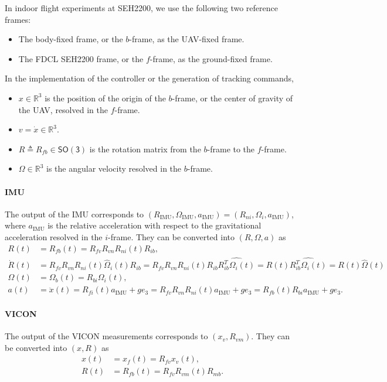 \documentclass[11pt]{article}
\newcommand{\SO}{\ensuremath{\mathsf{SO(3)}}}
\renewcommand{\Re}{\ensuremath{\mathbb{R}}}
\begin{document}
In indoor flight experiments at SEH2200, we use the following two reference frames:

\begin{itemize}
\item The body-fixed frame, or the $b$-frame, as the UAV-fixed frame.
\item The FDCL SEH2200 frame, or the $f$-frame, as the ground-fixed frame. 
\end{itemize}

\noindent In the implementation of the controller or the generation of tracking commands, 

\begin{itemize}
\item $x\in\Re^3$ is the position of the origin of the $b$-frame, or the center of gravity of the UAV, resolved in the $f$-frame. 
\item  $v=\dot x\in\Re^3$.
\item $R\triangleq R_{fb}\in\SO$ is the rotation matrix from the $b$-frame to the $f$-frame. 
\item $\Omega\in\Re^3$ is the angular velocity resolved in the $b$-frame. 
\end{itemize}

\newcommand{\IMU}{\mathrm{IMU}}
\paragraph{IMU} The output of the IMU corresponds to $(R_\IMU, \Omega_\IMU, a_\IMU)=(R_{ni},\Omega_{i},a_{\mathrm{IMU}})$, where $a_{\mathrm{IMU}}$ is the relative acceleration with respect to the gravitational acceleration resolved in the $i$-frame. They can be converted into $(R,\Omega,a)$ as
\begin{align}
R(t) & =R_{fb}(t) =  R_{fv} R_{vn} R_{ni}(t) R_{ib},\\
\dot R(t) & = R_{fv} R_{vn} R_{ni}(t)\hat\Omega_i(t) R_{ib}
=R_{fv} R_{vn} R_{ni}(t) R_{ib} \widehat{R_{ib}^T\Omega_i(t)}=R(t)\widehat{R_{ib}^T\Omega_i(t)}=R(t)\hat\Omega(t)
\\
\Omega(t) & = \Omega_b(t) =  R_{bi} \Omega_i(t),\\
a(t) & =\ddot x(t) = R_{fi}(t)a_{\mathrm{IMU}}+ge_3 = R_{fv}R_{vn} R_{ni}(t) a_{\mathrm{IMU}}+ge_3=R_{fb}(t) R_{bi} a_{\mathrm{IMU}} + ge_3.
\end{align}

\paragraph{VICON} The output of the VICON measurements corresponds to $(x_v,R_{vm})$. They can be converted into $(x,R)$ as
\begin{align}
x(t) & = x_f(t) = R_{fv} x_v(t),\\
R(t) & = R_{fb}(t) =    R_{fv} R_{vm}(t) R_{mb}.
\end{align}
\end{document}
